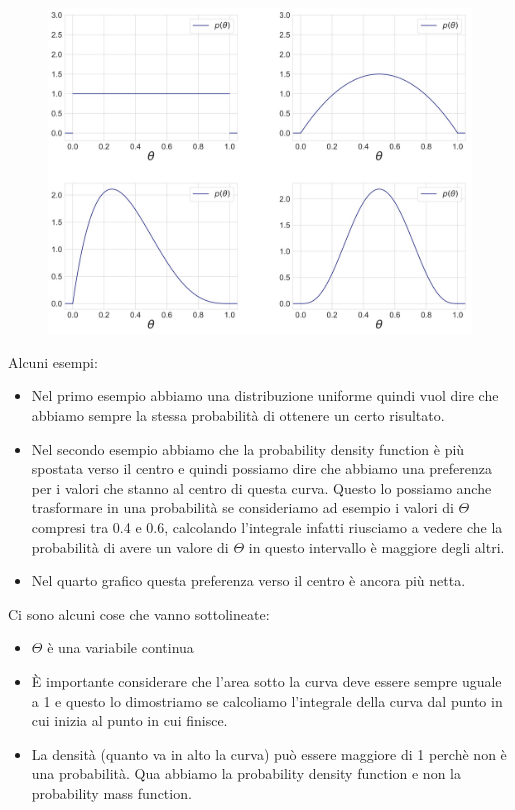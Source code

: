 \documentclass[14pt]{extreport}
\begin{document}
\begin{figure}[H]
	\centering
	\includegraphics[width=0.7\linewidth]{29.jpeg}
\end{figure}

Alcuni esempi:
\begin{itemize}
	\item Nel primo esempio abbiamo una distribuzione uniforme quindi vuol dire che abbiamo sempre la stessa probabilità di ottenere un certo
	risultato.
	\item Nel secondo esempio abbiamo che la probability density function è più spostata verso il centro e quindi possiamo dire che abbiamo una
	      preferenza per i valori che stanno al centro di questa curva. Questo lo possiamo anche trasformare in una probabilità se consideriamo ad
	      esempio i valori di $\Theta$ compresi tra 0.4 e 0.6, calcolando l'integrale infatti riusciamo a vedere che la probabilità di avere un valore
	      di $\Theta$ in questo intervallo è maggiore degli altri.
	\item Nel quarto grafico questa preferenza verso il centro è ancora più netta.
\end{itemize}

Ci sono alcuni cose che vanno sottolineate:
\begin{itemize}
	\item $\Theta$ è una variabile continua
	\item È importante considerare che l'area sotto la curva deve essere sempre uguale a 1 e questo lo dimostriamo se calcoliamo l'integrale della
	      curva dal punto in cui inizia al punto in cui finisce.
	\item La densità (quanto va in alto la curva) può essere maggiore di 1 perchè non è una probabilità. Qua abbiamo la probability density function e
	non la probability mass function.
\end{itemize}
\end{document}
